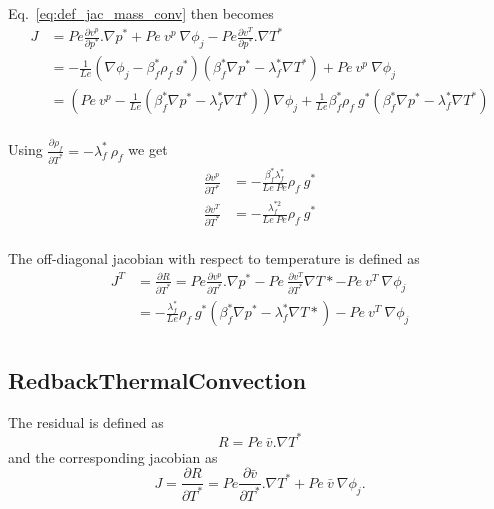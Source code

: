\documentclass[]{scrreprt}
\begin{document}
Eq.~\ref{eq:def_jac_mass_conv} then becomes
\begin{subequations}
  \label{eq:jac_mass_conv1}
  \begin{align}
  J &= Pe \frac{\partial v^p}{\partial p^*}.\nabla p^*
  	+ Pe\:v^p\:\nabla \phi_j - Pe\frac{\partial v^T}{\partial p^*}.\nabla T^* \\ \nonumber
  	&= -\frac{1}{Le} \left(\nabla \phi_j - \beta^*_f\rho_f\:g^* \right) (\beta^*_f\nabla p^* - \lambda^*_f\nabla T^*) + Pe\:v^p\:\nabla \phi_j \\ \nonumber
  	&= \left( Pe\:v^p -\frac{1}{Le}(\beta^*_f\nabla p^* - \lambda^*_f\nabla T^*) \right)\nabla \phi_j + \frac{1}{Le} \beta^*_f\rho_f\:g^*(\beta^*_f\nabla p^* - \lambda^*_f\nabla T^*) \\ \nonumber
  \end{align}
\end{subequations}

Using $\frac{\partial \rho_f}{\partial T^*} = -\lambda^*_f \: \rho_f$ we get
\begin{subequations}
  \begin{align}
  \frac{\partial v^p}{\partial T^*} &= -\frac{\beta^*_f \lambda^*_f}{Le\:Pe} \rho_f\:g^* \\
  \frac{\partial v^T}{\partial T^*} &= -\frac{\lambda^{*2}_f}{Le\:Pe} \rho_f\:g^* \\
  \end{align}
\end{subequations}

The off-diagonal jacobian with respect to temperature is defined as
\begin{subequations}
  \label{eq:off_diag_jac_mass_conv1}
  \begin{align}
  J^T &= \frac{\partial R}{\partial T^*} = Pe \frac{\partial v^p}{\partial T^*}.\nabla p^* - Pe\:\frac{\partial v^T}{\partial T^*}\nabla T* - Pe\:v^T\:\nabla \phi_j \\ \nonumber
    &=  -\frac{\lambda^*_f}{Le} \rho_f\:g^* (\beta^*_f \nabla p^* - \lambda^*_f \nabla T*) - Pe\:v^T\:\nabla \phi_j \\ \nonumber
  \end{align}
\end{subequations}

\subsection{RedbackThermalConvection}
The residual is defined as
\begin{equation}
  R = Pe\: \bar{v}.\nabla T^*
\end{equation}
and the corresponding jacobian as
\begin{equation}
  \label{eq:def_jac_heat_conv}
  J = \frac{\partial R}{\partial T^*} = Pe \frac{\partial \bar{v}}{\partial T^*}.\nabla T^* + Pe\:\bar{v}\:\nabla \phi_j.
\end{equation}
\end{document}
